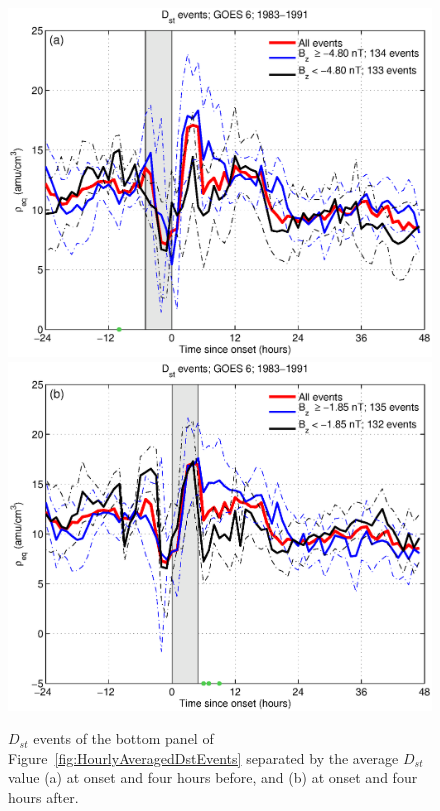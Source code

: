 \documentclass[12pt]{article}
\begin{document}
\clearpage
\begin{figure}[tp!]
  \centering
  \includegraphics[scale=0.40]{figures/RhoBinned/RhoBinnedB_z-case1-t020-tf25-GOES6.eps}
  \includegraphics[scale=0.40]{figures/RhoBinned/RhoBinnedB_z-case1-t025-tf30-GOES6.eps}
  \caption{$D_{st}$ events of the bottom panel of Figure~\ref{fig:HourlyAveragedDstEvents} separated by the average $D_{st}$ value (a) at onset and four hours before, and (b) at onset and four hours after.}
  \label{fig:BzBinnedDstEvents}
\end{figure}
\end{document}
